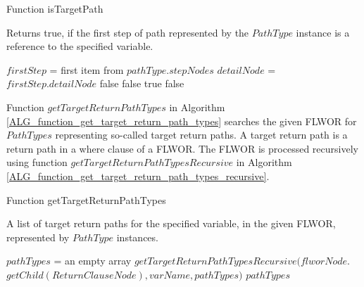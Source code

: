 \begin{algorithm}
\caption{Function isTargetPath}
\label{ALG_function_is_target_path}
\begin{algorithmic}[1]
\ENSURE Returns true, if the first step of path represented by the $PathType$ instance is a reference to the specified variable.


\STATE $firstStep$ = first item from  $pathType.stepNodes$
\STATE $detailNode$ = $firstStep.detailNode$
	\RETURN false
\ENDIF
{}
	\RETURN false
\ENDIF
{}
	\RETURN true
\ELSE
	\RETURN false
\ENDIF
\end{algorithmic}
\end{algorithm}

Function $getTargetReturnPathTypes$ in Algorithm \ref{ALG_function_get_target_return_path_types} searches the given FLWOR for $PathTypes$ representing so-called target return paths. A target return path is a return path in a where clause of a FLWOR. The FLWOR is processed recursively using function $getTargetReturnPathTypesRecursive$ in Algorithm \ref{ALG_function_get_target_return_path_types_recursive}.

\begin{algorithm}
\caption{Function getTargetReturnPathTypes}
\label{ALG_function_get_target_return_path_types}
\begin{algorithmic}[1]
\ENSURE A list of target return paths for the specified variable, in the given FLWOR, represented by $PathType$ instances.

\STATE $pathTypes$ = an empty array
\STATE $getTargetReturnPathTypesRecursive(flworNode.$ $getChild(ReturnClauseNode), varName, pathTypes)$
\RETURN $pathTypes$
\end{algorithmic}
\end{algorithm}

